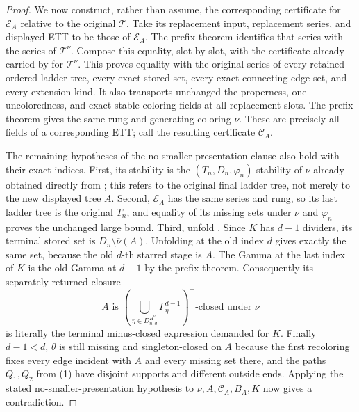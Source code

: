 \begin{proof}
We now construct, rather than assume, the corresponding certificate for
$\mathcal E_A$ relative to the original $\mathcal T$.  Take its
replacement input, replacement series, and displayed ETT to be those of
$\mathcal E_A$.  The prefix theorem identifies that series with the
series of $\mathcal T^\nu$.  Compose this equality, slot by slot, with
the certificate already carried by
 for $\mathcal T^\nu$.
This proves equality with the original series of every retained ordered
ladder tree, every exact stored set, every exact connecting-edge set,
and every extension kind.  It also transports unchanged the properness,
one-uncoloredness, and exact stable-coloring fields at all replacement
slots.  The prefix theorem gives the same rung and generating coloring
$\nu$.  These are precisely all fields of a corresponding ETT; call the
resulting certificate $\mathcal C_A$.

The remaining hypotheses of the no-smaller-presentation clause also hold
with their exact indices.  First, its stability is the
$(T_n,D_n,\varphi_n)$-stability of $\nu$ already obtained directly from
; this refers to the original final
ladder tree, not merely to the new displayed tree $A$.  Second,
$\mathcal E_A$ has the same series and rung, so its last ladder tree is
the original $T_n$, and equality of its missing sets under $\nu$ and
$\varphi_n$ proves the unchanged large bound.  Third, unfold
.  Since $K$ has $d-1$ dividers,
its terminal stored set is $D_n\setminus\overline\nu(A)$.  Unfolding
 at the old index $d$ gives exactly the
same set, because the old $d$-th starred stage is $A$.  The Gamma at the
last index of $K$ is the old Gamma at $d-1$ by the prefix theorem.
Consequently its separately returned closure
\[
 A\text{ is }
 \left(\bigcup_{\eta\in D^{H^\nu}_{n,d}}\Gamma^{d-1}_\eta\right)^-
 \text{-closed under }\nu
\]
is literally the terminal minus-closed expression demanded for $K$.
Finally $d-1<d$, $\theta$ is still missing and singleton-closed on $A$
because the first recoloring fixes every edge incident with $A$ and every
missing set there, and the paths $Q_1,Q_2$ from (1) have disjoint
supports and different outside ends.  Applying the stated
no-smaller-presentation hypothesis to
$\nu,A,\mathcal C_A,B_A,K$ now gives a contradiction.

\end{proof}
